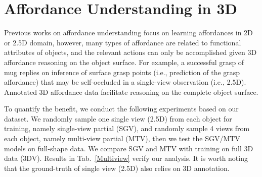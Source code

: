 \documentclass[final]{cvpr}
\begin{document}
\section{Affordance Understanding in 3D} \label{understanding in 3d}

\begin{table}[!htb]
\caption{The comparisons between 3D and 2.5D. P and D refer to PointNet++ and DGCNN respectively.
}
\label{Multiview}
\vspace{-0.3cm}
\end{table}

Previous works on affordance understanding focus on learning affordances in 2D or 2.5D domain, however, many types of affordance are related to functional attributes of objects, and the relevant actions can only be accomplished given 3D affordance reasoning on the object surface. For example, a successful grasp of mug replies on inference of surface grasp points (i.e., prediction of the grasp affordance) that may be self-occluded in a single-view observation (i.e., 2.5D). Annotated 3D affordance data facilitate reasoning on the complete object surface.

To quantify the benefit, we conduct the following experiments based on our dataset. We randomly sample one single view (2.5D) from each object for training, namely single-view partial (SGV), and randomly sample 4 views from each object, namely multi-view partial (MTV), then we test the SGV/MTV models on full-shape data. We compare SGV and MTV with training on full 3D data (3DV). Results in Tab.~\ref{Multiview} verify our analysis. It is worth noting that the ground-truth of single view (2.5D) also relies on 3D annotation.
\end{document}
